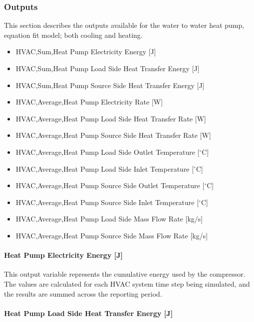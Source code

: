 \subsubsection{Outputs}\label{outputs-12-004}

This section describes the outputs available for the water to water heat pump, equation fit model; both cooling and heating.

\begin{itemize}
    \item
    HVAC,Sum,Heat Pump Electricity Energy {[}J{]}
    \item
    HVAC,Sum,Heat Pump Load Side Heat Transfer Energy {[}J{]}
    \item
    HVAC,Sum,Heat Pump Source Side Heat Transfer Energy {[}J{]}
    \item
    HVAC,Average,Heat Pump Electricity Rate {[}W{]}
    \item
    HVAC,Average,Heat Pump Load Side Heat Transfer Rate {[}W{]}
    \item
    HVAC,Average,Heat Pump Source Side Heat Transfer Rate {[}W{]}
    \item
    HVAC,Average,Heat Pump Load Side Outlet Temperature {[}$^\circ$C{]}
    \item
    HVAC,Average,Heat Pump Load Side Inlet Temperature {[}$^\circ$C{]}
    \item
    HVAC,Average,Heat Pump Source Side Outlet Temperature {[}$^\circ$C{]}
    \item
    HVAC,Average,Heat Pump Source Side Inlet Temperature {[}$^\circ$C{]}
    \item
    HVAC,Average,Heat Pump Load Side Mass Flow Rate {[}kg/s{]}
    \item
    HVAC,Average,Heat Pump Source Side Mass Flow Rate {[}kg/s{]}
\end{itemize}

\paragraph{Heat Pump Electricity Energy {[}J{]}}\label{water-to-water-heat-pump-electric-energy-j}

This output variable represents the cumulative energy used by the compressor. The values are calculated for each HVAC system time step being simulated, and the results are summed across the reporting period.

\paragraph{Heat Pump Load Side Heat Transfer Energy {[}J{]}}\label{water-to-water-heat-pump-load-side-heat-transfer-energy-j}

